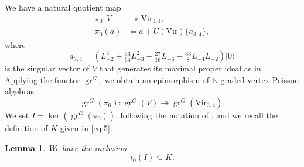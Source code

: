 \documentclass[a4paper, 12pt, reqno]{amsart}
\newtheorem{lemma}[theorem]{Lemma}
\theoremstyle{remark}
\DeclareMathOperator{\gr}{gr}
\newcommand{\vac}{{|0\rangle}}
\newcommand{\Vir}{{\mathrm{Vir}}}
\begin{document}
We have a natural quotient map
\begin{align*}
  \pi_0: V &\twoheadrightarrow \Vir_{3, 4}, \\
  \pi_0(a) &= a + U(\Vir)\{a_{3, 4}\},
\end{align*}
where
\begin{equation*}
  a_{3, 4} = (L_{-2}^3 + \tfrac{93}{64}L_{-3}^2 - \tfrac{27}{16}L_{-6} - \tfrac{33}{8}L_{-4}L_{-2})\vac
\end{equation*}
is the singular vector of $V$ that generates its maximal proper ideal as in \cite{andrews_singular_2022}.
Applying the functor $\gr^G$, we obtain an epimorphism of $\mathbb{N}$-graded vertex Poisson algebras
\begin{equation*}
  \gr^G(\pi_0): \gr^G(V) \twoheadrightarrow \gr^G(\Vir_{3, 4}).
\end{equation*}
We set $I = \ker(\gr^G(\pi_0))$, following the notation of \cite{andrews_singular_2022}, and we recall the definition of $K$ given in \eqref{eq:5}.

\begin{lemma}
  \label{lmm:9}
  We have the inclusion
  \begin{equation*}
    \iota_0(I) \subseteq K.
  \end{equation*}
\end{lemma}
\end{document}
